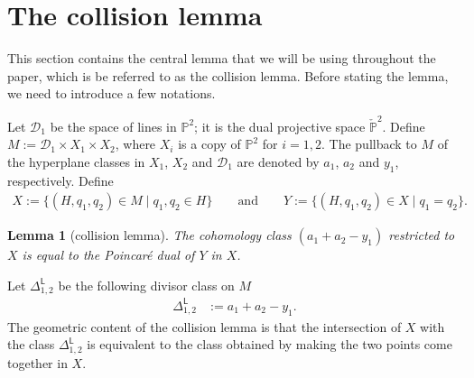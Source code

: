 \documentclass[11pt]{article}
\numberwithin{equation}{section}
\newtheorem{lmm}[thm]{Lemma}
\begin{document}
\section{The collision lemma}
\label{coll_lemm}

This section contains the central lemma that we will be using throughout the paper, which is
be referred to as the collision lemma. Before stating the lemma, we need to introduce a few notations.

Let $\mathcal{D}_1$ be the space of lines in $\mathbb{P}^2$; it is the dual projective space $\check{\mathbb{P}}^2$. Define
$
M := \mathcal{D}_1 \times X_{1} \times X_{2}$,
where $X_i$ is a copy of $\mathbb{P}^2$ for $i = 1, 2$.
The pullback to $M$ of the hyperplane classes in
$X_{1}$, $X_{2}$ and $\mathcal{D}_1$ are denoted by $a_1$, $a_2$ and $y_1$, respectively. Define
\begin{align*}
X := \{ (H, q_1, q_2) \in M  \mid  q_1, q_2 \in H\}
\qquad \text{and}
\qquad
Y := \{ (H, q_1, q_2) \in X  \mid  q_1= q_2\}.
\end{align*}
\begin{lmm}[{collision lemma}]\label{CL_ver2}
The cohomology class $(a_1+a_2-y_1)$ restricted to $X$ is equal to
the Poincar\'{e} dual of $Y$ in $X$.
\end{lmm}

\begin{rem}
 Let $\Delta_{1, 2}^{\mathsf{L}}$
be the following divisor class on $M$
\begin{align}
\Delta_{1, 2}^{\mathsf{L}}& := a_1 + a_2-y_1. \label{Line_Diag_Defn}
\end{align}
The geometric content of the collision lemma
is that the intersection of $X$ with the class $\Delta_{1, 2}^{\mathsf{L}}$ is equivalent to the class
obtained by making the two points come together in $X$. \end{rem}
\end{document}
